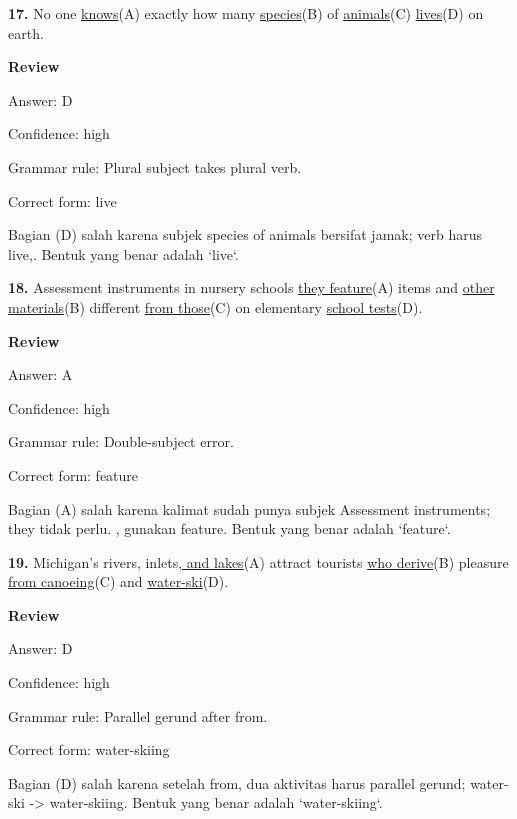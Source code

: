 \documentclass[12pt]{article}
\begin{document}
\endgroup
\par
\vspace{\questionblockgap}
\noindent\textbf{17.} No one \uline{knows}(A) exactly how many \uline{species}(B) of \uline{animals}(C) \uline{lives}(D) on earth.
\par
\begingroup
\setlength{\parskip}{0pt}
\setlength{\parindent}{0pt}
\textbf{Review}\par
Answer: D\par
Confidence: high\par
Grammar rule: Plural subject takes plural verb.\par
Correct form: live\par
Bagian (D) salah karena subjek species of animals bersifat jamak; verb harus live,. Bentuk yang benar adalah `live`.\par
\endgroup
\par
\vspace{\questionblockgap}
\noindent\textbf{18.} Assessment instruments in nursery schools \uline{they feature}(A) items and \uline{other materials}(B) different \uline{from those}(C) on elementary \uline{school tests}(D).
\par
\begingroup
\setlength{\parskip}{0pt}
\setlength{\parindent}{0pt}
\textbf{Review}\par
Answer: A\par
Confidence: high\par
Grammar rule: Double-subject error.\par
Correct form: feature\par
Bagian (A) salah karena kalimat sudah punya subjek Assessment instruments; they tidak perlu. , gunakan feature. Bentuk yang benar adalah `feature`.\par
\endgroup
\par
\vspace{\questionblockgap}
\noindent\textbf{19.} Michigan's rivers, inlets,\uline{ and lakes}(A) attract tourists \uline{who derive}(B) pleasure \uline{from canoeing}(C) and \uline{water-ski}(D).
\par
\begingroup
\setlength{\parskip}{0pt}
\setlength{\parindent}{0pt}
\textbf{Review}\par
Answer: D\par
Confidence: high\par
Grammar rule: Parallel gerund after from.\par
Correct form: water-skiing\par
Bagian (D) salah karena setelah from, dua aktivitas harus parallel gerund; water-ski -> water-skiing. Bentuk yang benar adalah `water-skiing`.\par
\end{document}
